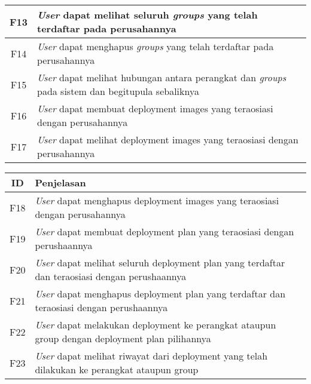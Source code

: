 \begin{table}[ht]
\begin{tabular}{|c|p{12cm}|}
    \hline
    F13 & \textit{User} dapat melihat seluruh \textit{groups} yang telah terdaftar pada perusahannya                      \\
    \hline
    F14 & \textit{User} dapat menghapus \textit{groups} yang telah terdaftar pada perusahannya                            \\
    \hline
    F15 & \textit{User} dapat melihat hubungan antara perangkat dan \textit{groups} pada sistem dan begitupula sebaliknya \\
    \hline
    F16 & \textit{User} dapat membuat deployment images yang teraosiasi dengan perusahannya                               \\
    \hline
    F17 & \textit{User} dapat melihat deployment images yang teraosiasi dengan perusahannya                               \\
    \hline
  \end{tabular}
\end{table}
\egroup

\pagebreak

\bgroup
\begin{table}[ht]
  \def\arraystretch{1.7}
  \centering
  \begin{tabular}{|c|p{12cm}|}
    \hline
    ID  & Penjelasan                                                                                            \\

    \hline
    F18 & \textit{User} dapat menghapus deployment images yang teraosiasi dengan perusahannya                   \\
    \hline
    F19 & \textit{User} dapat membuat deployment plan yang teraosiasi dengan perushaannya                       \\
    \hline
    F20 & \textit{User} dapat melihat seluruh deployment plan yang terdaftar dan teraosiasi dengan perushaannya \\
    \hline
    F21 & \textit{User} dapat menghapus deployment plan yang terdaftar dan teraosiasi dengan perushaannya       \\
    \hline
    F22 & \textit{User} dapat melakukan deployment ke perangkat ataupun group dengan deployment plan pilihannya \\
    \hline
    F23 & \textit{User} dapat melihat riwayat dari deployment yang telah dilakukan ke perangkat ataupun group   \\
    \hline
  \end{tabular}
\end{table}
\egroup

